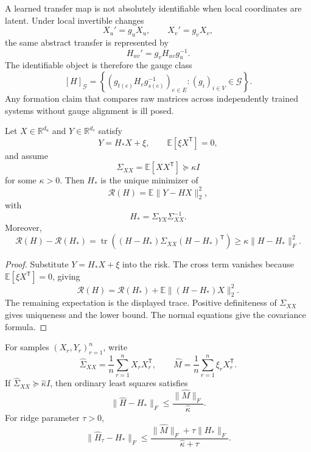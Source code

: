 
A learned transfer map is not absolutely identifiable when local coordinates
are latent. Under local invertible changes
\[
X_u'=g_uX_u,
\qquad
X_v'=g_vX_v,
\]
the same abstract transfer is represented by
\[
H_{uv}'=g_vH_{uv}g_u^{-1}.
\]
The identifiable object is therefore the gauge class
\[
[H]_{\mathcal G}
=
\left\{
(g_{t(e)}H_eg_{s(e)}^{-1})_{e\in E}
:
(g_i)_{i\in V}\in\mathcal G
\right\}.
\]
Any formation claim that compares raw matrices across independently trained
systems without gauge alignment is ill posed.


\begin{SRWTtheorem}\label{SRWT:thm:transfer-identification}
Let \(X\in\mathbb R^{d_u}\) and \(Y\in\mathbb R^{d_v}\) satisfy
\[
Y=H_*X+\xi,
\qquad
\mathbb E[\xi X^{\mathsf T}]=0,
\]
and assume
\[
\Sigma_{XX}
=
\mathbb E[XX^{\mathsf T}]
\succeq
\kappa I
\]
for some \(\kappa>0\). Then \(H_*\) is the unique minimizer of
\[
\mathcal R(H)
=
\mathbb E\|Y-HX\|_2^2,
\]
with
\[
\boxed{
H_*
=
\Sigma_{YX}\Sigma_{XX}^{-1}.
}
\]
Moreover,
\[
\boxed{
\mathcal R(H)-\mathcal R(H_*)
=
\operatorname{tr}
\left(
(H-H_*)\Sigma_{XX}(H-H_*)^{\mathsf T}
\right)
\geq
\kappa\|H-H_*\|_F^2.
}
\]
\end{SRWTtheorem}

\begin{proof}
Substitute \(Y=H_*X+\xi\) into the risk. The cross term vanishes because
\(\mathbb E[\xi X^{\mathsf T}]=0\), giving
\[
\mathcal R(H)
=
\mathcal R(H_*)
+
\mathbb E\|(H-H_*)X\|_2^2.
\]
The remaining expectation is the displayed trace. Positive definiteness of
\(\Sigma_{XX}\) gives uniqueness and the lower bound. The normal equations
give the covariance formula.
\end{proof}

\begin{SRWTcorollary}
\label{SRWT:cor:empirical-transfer-bound}
For samples \((X_r,Y_r)_{r=1}^n\), write
\[
\widehat\Sigma_{XX}
=
\frac1n\sum_{r=1}^nX_rX_r^{\mathsf T},
\qquad
\widehat M
=
\frac1n\sum_{r=1}^n\xi_rX_r^{\mathsf T}.
\]
If \(\widehat\Sigma_{XX}\succeq\widehat\kappa I\), then ordinary least squares
satisfies
\[
\boxed{
\|\widehat H-H_*\|_F
\leq
\frac{\|\widehat M\|_F}{\widehat\kappa}.
}
\]
For ridge parameter \(\tau>0\),
\[
\boxed{
\|\widehat H_\tau-H_*\|_F
\leq
\frac{
\|\widehat M\|_F+\tau\|H_*\|_F
}{
\widehat\kappa+\tau
}.
}
\]
\end{SRWTcorollary}

